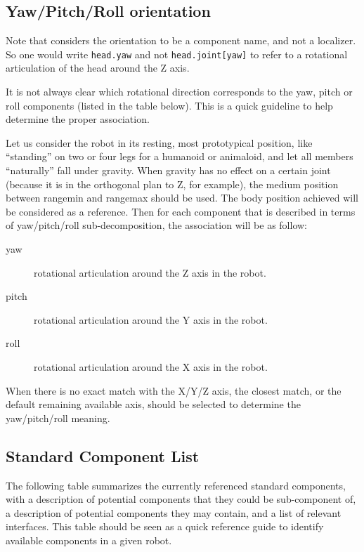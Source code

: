 \subsection{Yaw/Pitch/Roll orientation}
\label{sec:naming:ypr}

Note that \gsrapi considers the orientation to be a component name, and
not a localizer. So one would write \lstinline|head.yaw| and not
\lstinline|head.joint[yaw]| to refer to a rotational articulation of the head
around the Z axis.

It is not always clear which rotational direction corresponds to the
yaw, pitch or roll components (listed in the table below). This is a
quick guideline to help determine the proper association.

Let us consider the robot in its resting, most prototypical position,
like ``standing'' on two or four legs for a humanoid or animaloid, and
let all members ``naturally'' fall under gravity. When gravity has no
effect on a certain joint (because it is in the orthogonal plan to Z,
for example), the medium position between rangemin and rangemax should
be used. The body position achieved will be considered as a reference.
Then for each component that is described in terms of yaw/pitch/roll
sub-decomposition, the association will be as follow:

\begin{description}
\item[yaw] rotational articulation around the Z axis in the robot.
\item[pitch] rotational articulation around the Y axis in the robot.
\item[roll] rotational articulation around the X axis in the robot.
\end{description}

When there is no exact match with the X/Y/Z axis, the closest match, or
the default remaining available axis, should be selected to determine
the yaw/pitch/roll meaning.

\subsection{Standard Component List}
\label{sec:naming:components}

The following table summarizes the currently referenced standard
components, with a description of potential components that they could
be sub-component of, a description of potential components they may
contain, and a list of relevant interfaces. This table should be seen as a
quick reference guide to identify available components in a given
robot.

